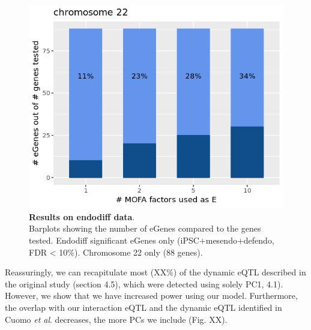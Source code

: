 \begin{figure}[htbp]
\centering
\includegraphics[width=14cm]{Chapter6/Fig/sc_structlmm_endodiff_mofa.png}
\caption[Results on endodiff data]{\textbf{Results on endodiff data}.\\
Barplots showing the number of eGenes compared to the genes tested.
Endodiff significant eGenes only (iPSC+mesendo+defendo, FDR < 10\%).
Chromosome 22 only (88 genes).}
\label{fig:sc_structlmm_endo_barplots}
\end{figure}

Reassuringly, we can recapitulate most (XX\%) of the dynamic eQTL described in the original study (section 
4.5), which were detected using solely PC1, 
4.1).
However, we show that we have increased power using our model. 
Furthermore, the overlap with our interaction eQTL and the dynamic eQTL identified in Cuomo \textit{et al}. decreases, the more PCs we include (Fig. XX).\\










